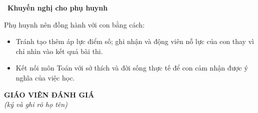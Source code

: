 \documentclass[12pt, a4paper]{article}
\newcommand{\subh}[2]{\vspace{1pt}{\hf\bfseries\color{brand}#1.}~{\hf\bfseries\color{ink}#2}\par\vspace{2pt}}
\begin{document}
\subh{3.2}{Khuyến nghị cho phụ huynh}
Phụ huynh nên đồng hành với con bằng cách:
\begin{itemize}
  \item Tránh tạo thêm áp lực điểm số; ghi nhận và động viên nỗ lực của con thay vì chỉ nhìn vào kết quả bài thi.
  \item Kết nối môn Toán với sở thích và đời sống thực tế để con cảm nhận được ý nghĩa của việc học.
\end{itemize}

\vspace{10pt}
\begin{flushright}
\begin{minipage}{6.5cm}
\centering
{\hf\bfseries GIÁO VIÊN ĐÁNH GIÁ}\\
\textit{(ký và ghi rõ họ tên)}\\[1.4cm]
\end{minipage}
\end{flushright}
\end{document}
